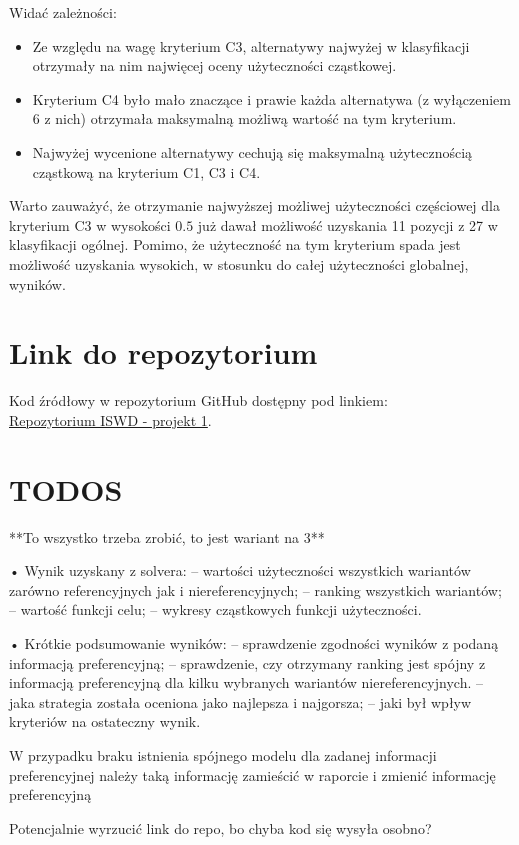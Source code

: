 \documentclass[11pt]{article}
\begin{document}
Widać zależności:
\begin{itemize}
\item Ze względu na wagę kryterium C3, alternatywy najwyżej w klasyfikacji otrzymały na nim najwięcej oceny użyteczności cząstkowej.
\item Kryterium C4 było mało znaczące i prawie każda alternatywa (z wyłączeniem 6 z nich) otrzymała maksymalną możliwą wartość na tym kryterium.
\item Najwyżej wycenione alternatywy cechują się maksymalną użytecznością cząstkową na kryterium C1, C3 i C4.
\end{itemize}

Warto zauważyć, że otrzymanie najwyższej możliwej użyteczności częściowej dla kryterium C3 w wysokości $0.5$ już dawał możliwość uzyskania 11 pozycji z 27 w klasyfikacji ogólnej. Pomimo, że użyteczność na tym kryterium spada jest możliwość uzyskania wysokich, w stosunku do całej użyteczności globalnej, wyników. 

\section{Link do repozytorium}\label{sec:link-do-repo}
Kod źródłowy w repozytorium GitHub dostępny pod linkiem: \\
\href{https://github.com/KotZPolibudy/PUT_ISWD/tree/main/projekt1}{Repozytorium ISWD - projekt 1}.


\section{TODOS}\label{sec:todos}

**To wszystko trzeba zrobić, to jest wariant na 3**

• Wynik uzyskany z solvera:
– wartości użyteczności wszystkich wariantów zarówno referencyjnych jak i niereferencyjnych;
– ranking wszystkich wariantów;
– wartość funkcji celu;
– wykresy cząstkowych funkcji użyteczności.

• Krótkie podsumowanie wyników:
– sprawdzenie zgodności wyników z podaną informacją preferencyjną;
– sprawdzenie, czy otrzymany ranking jest spójny z informacją preferencyjną dla kilku wybranych wariantów niereferencyjnych.
– jaka strategia została oceniona jako najlepsza i najgorsza;
– jaki był wpływ kryteriów na ostateczny wynik.

W przypadku braku istnienia spójnego modelu dla zadanej informacji preferencyjnej należy taką
informację zamieścić w raporcie i zmienić informację preferencyjną

Potencjalnie wyrzucić link do repo, bo chyba kod się wysyła osobno?
\end{document}
